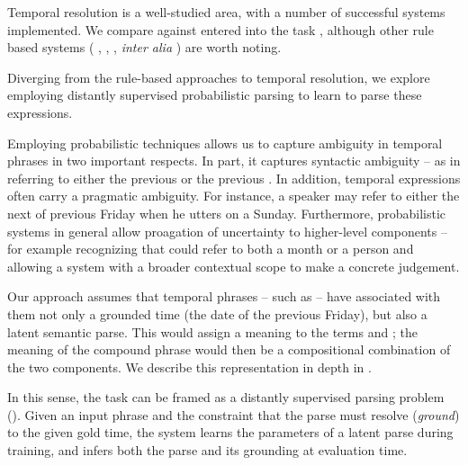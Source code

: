 
Temporal resolution is a well-studied area, with a number of successful systems
	implemented.
We compare against  \cite{key:2010strotgen-temporal}
	entered into the  task \cite{key:2010verhagen-tempeval},
	although other rule based systems (
		, 	,
		, \textit{inter alia}
	) are worth noting.

Diverging from the rule-based approaches to temporal resolution,
	we explore employing distantly supervised probabilistic parsing
	to learn to parse these expressions.

Employing probabilistic techniques allows us to capture ambiguity in temporal 
	phrases in two important respects.
In part, it captures syntactic ambiguity -- as in  referring to either the previous  or the previous
	.
In addition, temporal expressions often carry a pragmatic ambiguity.
For instance, a speaker may refer to either the next of previous Friday
	when he utters  on a Sunday.
Furthermore, probabilistic systems in general allow proagation of uncertainty
	to higher-level components -- for example recognizing that  could
	refer to both a month or a person and allowing a system with a broader
	contextual scope to make a concrete judgement.

Our approach assumes that temporal phrases -- such as  -- have
	associated with them not only a grounded time (the date of the previous
	Friday), but also a latent semantic parse.
This would assign a meaning to the terms  and ; the
	meaning of the compound phrase would then be a compositional combination
	of the two components.
We describe this representation in depth in .

In this sense, the task can be framed as a distantly supervised parsing
	problem ().
Given an input phrase and the constraint that the parse must resolve 
	(\textit{ground}) to the
	given gold time, the system learns the parameters of a latent parse during
	training, and infers both the parse and its grounding at evaluation time.


